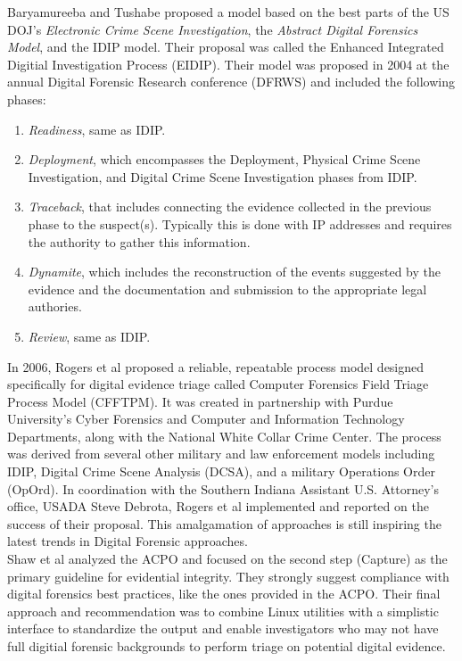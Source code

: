 \documentclass[12pt]{article}
\begin{document}
Baryamureeba and Tushabe\cite{baryamureeba2004enhanced} proposed a model based
on the best parts of the US DOJ's {\em Electronic Crime
Scene Investigation}, the {\em Abstract Digital Forensics Model}, and 
the IDIP model.  Their proposal was called the
Enhanced Integrated Digitial Investigation Process (EIDIP).
Their model was proposed in 2004 at the annual Digital Forensic Research conference
(DFRWS)\cite{baryamureeba2004enhanced} and included the following phases:

\begin{enumerate}
  \item {\em Readiness}, same as IDIP.
  \item {\em Deployment}, which encompasses the Deployment,
  Physical Crime Scene Investigation, and Digital Crime Scene
  Investigation phases from IDIP.
  \item {\em Traceback}, that includes connecting the evidence collected
  in the previous phase to the suspect(s).  Typically this is done with IP
  addresses and requires the authority to gather this information.
  \item {\em Dynamite}, which includes the reconstruction of the events
  suggested by the evidence and  the documentation and submission to the
  appropriate legal authories.
  \item {\em Review}, same as IDIP.
\end{enumerate}

In 2006, Rogers et al\cite{rogers2006computer} proposed a reliable, repeatable process 
model designed specifically for digital evidence triage called
Computer Forensics Field Triage Process Model (CFFTPM). It was created in partnership
with Purdue University's Cyber Forensics and Computer and Information
Technology Departments, along with the National White Collar Crime
Center\cite{rogers2006computer}.
The process was derived from several other military and law enforcement models
including IDIP, 
Digital Crime Scene Analysis (DCSA),
and a military Operations Order (OpOrd).  In coordination with the Southern Indiana 
Assistant U.S. Attorney's office,
USADA Steve Debrota, Rogers et al\cite{rogers2006computer} implemented and reported
on the success of their proposal.  This amalgamation of approaches is still inspiring 
the latest trends in Digital Forensic approaches.\\

Shaw et al\cite{shaw2013practical} analyzed the ACPO and focused on the second step (Capture)
as the primary guideline for evidential integrity.  They strongly suggest compliance with
digital forensics best practices, like the ones provided in the ACPO.  Their final approach
and recommendation was to combine Linux utilities with a simplistic interface to standardize
the output and enable investigators who may not have full digitial forensic backgrounds
to perform triage on potential digital evidence.\\
\end{document}
